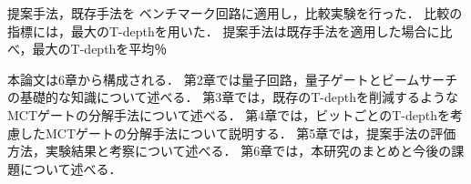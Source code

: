   \par
  提案手法，既存手法\cite{abdessaied2016technology,niemann2019t,baker2019decomposing}を
  ベンチマーク回路\cite{wille2008revlib}に適用し，比較実験を行った．
  比較の指標には，最大のT-depthを用いた．
  提案手法は既存手法を適用した場合に比べ，最大のT-depthを平均％
  \par
  本論文は6章から構成される．
  第2章では量子回路，量子ゲートとビームサーチの基礎的な知識について述べる．
  第3章では，既存のT-depthを削減するようなMCTゲートの分解手法について述べる．
  第4章では，ビットごとのT-depthを考慮したMCTゲートの分解手法について説明する．
  第5章では，提案手法の評価方法，実験結果と考察について述べる．
  第6章では，本研究のまとめと今後の課題について述べる．
